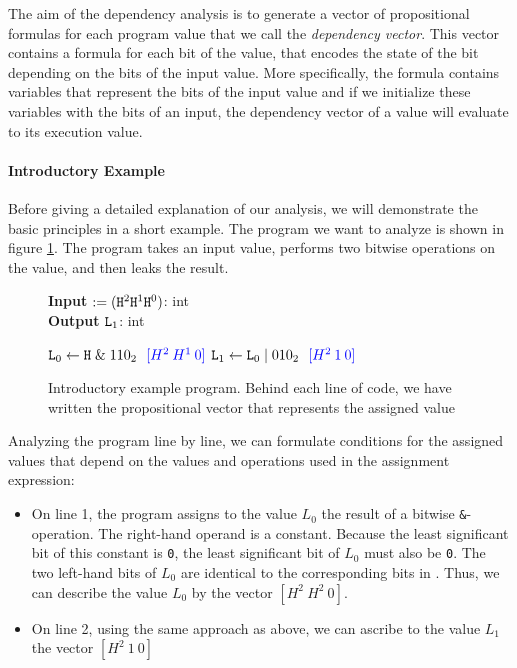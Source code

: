 The aim of the dependency analysis is to generate a vector of propositional formulas for each program value that we call the \emph{dependency vector}.  This vector contains a formula for each bit of the value, that encodes the state of the bit depending on the bits of the input value. More specifically, the formula contains variables that represent the bits of the input value and if we initialize these variables with the bits of an input, the dependency vector of a value will evaluate to its execution value.

\paragraph{Introductory Example}\label{p:intro}
Before giving a detailed explanation of our analysis, we will demonstrate the basic principles in a short example. The program we want to analyze is shown in figure \ref{fig:introEx}. The program takes an input value, performs two bitwise operations on the value, and then leaks the result. 

\begin{figure}
    \centering
    \begin{minipage}{.7\linewidth}
        \begin{algorithm}[H]
            \hspace*{\algorithmicindent} \textbf{Input} \In $:= (\mathtt{H}^2 \mathtt{H}^1 \mathtt{H}^0)$: int \\
            \hspace*{\algorithmicindent} \textbf{Output} $\mathtt{L}_1$: int
            \hspace*{1em}
            \begin{algorithmic}[1]
                \State $\mathtt{L}_0 \leftarrow \mathtt{H} \; \& \; 110_2 \: \: \: \textcolor{blue}{[H^2 \: H^1 \:0]}$
                \State $\mathtt{L}_1 \leftarrow \mathtt{L}_0 \; | \; 010_2 \: \: \: \textcolor{blue}{[H^2 \: 1 \: 0]}$
            \end{algorithmic} 
        \end{algorithm}
\end{minipage}
\caption{Introductory example program. Behind each line of code, we have written the propositional vector that represents the assigned value}
\label{fig:introEx}
\end{figure}

Analyzing the program line by line, we can formulate conditions for the assigned values that depend on the values and operations used in the assignment expression:
\begin{itemize}
    \item On line 1, the program assigns to the value $L_0$ the result of a bitwise \texttt{\&}-operation. The right-hand operand is a constant. Because the least significant bit of this constant is \texttt{0}, the least significant bit of $L_0$ must also be \texttt{0}. The two left-hand bits of $L_0$ are identical to the corresponding bits in \In. Thus, we can describe the value $L_0$ by the vector $[H^2 \: H^2 \: 0]$.
    \item On line 2, using the same approach as above, we can ascribe to the value $L_1$ the vector $[H^2 \: 1 \: 0]$
\end{itemize}

